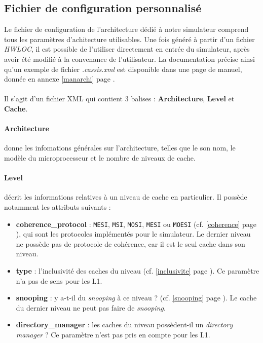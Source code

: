 \subsection{Fichier de configuration personnalisé}
\label{config}
Le fichier de configuration de l'architecture dédié à notre simulateur comprend tous les paramètres d'achitecture utilisables. Une fois généré à partir d'un fichier \emph{HWLOC}, il est possible de l'utiliser directement en entrée du simulateur, après avoir été modifié à la convenance de l'utilisateur. La documentation précise ainsi qu'un exemple de fichier \textit{.cassis.xml} est disponible dans une page de manuel, donnée en annexe \ref{manarchi} page \pageref{manarchi}.

\paragraph{}
Il s'agit d'un fichier XML qui contient 3 balises : \textbf{Architecture}, \textbf{Level} et \textbf{Cache}.

\paragraph{Architecture} donne les infomations générales sur l'architecture, telles que le son nom, le modèle du microprocesseur et le nombre de niveaux de cache.

\paragraph{Level} décrit les informations relatives à un niveau de cache en particulier. Il possède notamment les attributs suivants :
\begin{itemize}
  \item \textbf{coherence\_protocol} : \verb?MESI?, \verb?MSI?, \verb?MOSI?, \verb?MESI? ou \verb?MOESI? (cf. \ref{coherence} page \pageref{coherence}), qui sont les protocoles implémentés pour le simulateur. Le dernier niveau ne possède pas de protocole de cohérence, car il est le seul cache dans son niveau.
  \item \textbf{type} : l'inclusivité des caches du niveau (cf. \ref{inclusivite} page \pageref{inclusivite}). Ce paramètre n'a pas de sens pour les L1.
  \item \textbf{snooping} : y a-t-il du \textit{snooping} à ce niveau ? (cf. \ref{snooping} page \pageref{snooping}). Le cache du dernier niveau ne peut pas faire de \textit{snooping}.
  \item \textbf{directory\_manager} : les caches du niveau possèdent-il un \textit{directory manager} ? Ce paramètre n'est pas pris en compte pour les L1.
\end{itemize}


